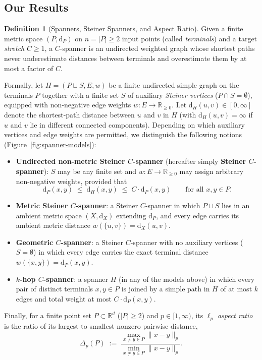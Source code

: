 \documentclass[11pt]{article}
\theoremstyle{definition}
\newtheorem{definition}[theorem]{Definition}
\theoremstyle{remark}
\newcommand{\R}{\mathbb{R}}
\newcommand{\dH}{\mathrm{d}_H}
\newcommand{\dP}{\mathrm{d}_P}
\begin{document}
\subsection{Our Results}
\label{subsec:results}

\begin{definition}[Spanners, Steiner Spanners, and Aspect Ratio]
\label{def:spanner}
Given a finite metric space $(P, \dP)$ on $n = |P| \ge 2$ input points (called \emph{terminals}) and a target \emph{stretch} $C \ge 1$, a $C$-spanner is an undirected weighted graph whose shortest paths never underestimate distances between terminals and overestimate them by at most a factor of $C$.

Formally, let $H = (P \sqcup S, E, w)$ be a finite undirected simple graph on the terminals $P$ together with a finite set $S$ of auxiliary \emph{Steiner vertices} ($P \cap S = \emptyset$), equipped with non-negative edge weights $w : E \to \R_{\ge 0}$. Let $\dH(u, v) \in [0, \infty]$ denote the shortest-path distance between $u$ and $v$ in $H$ (with $\dH(u, v) = \infty$ if $u$ and $v$ lie in different connected components). Depending on which auxiliary vertices and edge weights are permitted, we distinguish the following notions (Figure~\ref{fig:spanner-models}):
\begin{itemize}[leftmargin=2em,nosep,topsep=4pt,itemsep=3pt]
  \item \textbf{Undirected non-metric Steiner $C$-spanner} (hereafter simply \textbf{Steiner $C$-spanner}): $S$ may be any finite set and $w : E \to \R_{\ge 0}$ may assign arbitrary non-negative weights, provided that
  \[
  \dP(x, y) \;\le\; \dH(x, y) \;\le\; C \cdot \dP(x, y) \qquad \text{for all } x, y \in P.
  \]
  \item \textbf{Metric Steiner $C$-spanner}: a Steiner $C$-spanner in which $P \sqcup S$ lies in an ambient metric space $(X, \mathrm{d}_X)$ extending $\dP$, and every edge carries its ambient metric distance $w(\{u, v\}) = \mathrm{d}_X(u, v)$.
  \item \textbf{Geometric $C$-spanner}: a Steiner $C$-spanner with no auxiliary vertices ($S = \emptyset$) in which every edge carries the exact terminal distance $w(\{x, y\}) = \dP(x, y)$.
  \item \textbf{$k$-hop $C$-spanner}: a spanner $H$ (in any of the models above) in which every pair of distinct terminals $x, y \in P$ is joined by a simple path in $H$ of at most $k$ edges and total weight at most $C \cdot \dP(x, y)$.
\end{itemize}
Finally, for a finite point set $P \subset \R^d$ ($|P| \ge 2$) and $p \in [1, \infty)$, its $\ell_p$ \emph{aspect ratio} is the ratio of its largest to smallest nonzero pairwise distance,
\[
\Delta_p(P) \;:=\; \frac{\max_{x \ne y \in P} \|x - y\|_p}{\min_{x \ne y \in P} \|x - y\|_p}.
\]
\end{definition}
\end{document}
